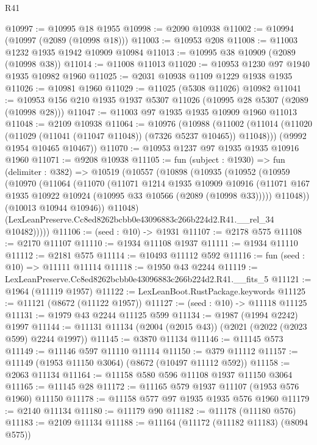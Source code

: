 \begin{lexlean}{R41}
\begin{coremodule}
@10997 := @10995 @18 @1955
@10998 := @2090 @10938
@11002 := @10994 (@10997 (@2089 (@10998 @18)))
@11003 := @10953 @208
@11008 := @11003 @1232 @1935 @1942 @10909 @10984
@11013 := @10995 @38 @10909 (@2089 (@10998 @38))
@11014 := @11008 @11013
@11020 := @10953 @1230 @97 @1940 @1935 @10982 @1960
@11025 := @2031 @10938 @1109 @1229 @1938 @1935
@11026 := @10981 @1960
@11029 := @11025 (@5308 @11026) @10982
@11041 := @10953 @156 @210 @1935 @1937 @5307 @11026 (@10995 @28 @5307 (@2089 (@10998 @28)))
@11047 := @11003 @97 @1935 @1935 @10909 @1960 @11013
@11048 := @2109 @10938
@11064 := @10976
    (@10988
      (@11002 (@11014 (@11020 (@11029 (@11041 (@11047 @11048)) (@7326 @5237 @10465)) @11048)))
      (@9992 @1954 @10465 @10467))
@11070 := @10953 @1237 @97 @1935 @1935 @10916 @1960
@11071 := @9208 @10938
@11105 := fun (subject : @1930) =>
  fun (delimiter : @382) =>
  @10519
    (@10557
      (@10898
        (@10935
          (@10952
            (@10959
              (@10970
                (@11064
                  (@11070
                    (@11071
                      @1214
                      @1935
                      @10909
                      @10916
                      (@11071 @167 @1935 @10922 @10924 (@10995 @33 @10566 (@2089 (@10998 @33)))))
                    @11048))
                (@10013 @10944 @10946))
              @11048)
            (LexLeanPreserve.Cc8ed8262bcbb0e43096883c266b224d2.R41.__rel_34 @10482)))))
@11106 := (seed : @10) -> @1931
@11107 := @2178 @575
@11108 := @2170 @11107
@11110 := @1934 @11108 @1937
@11111 := @1934 @11110
@11112 := @2181 @575
@11114 := @10493 @11112 @592
@11116 := fun (seed : @10) => @11111 @11114
@11118 := @1950 @43 @2244
@11119 := LexLeanPreserve.Cc8ed8262bcbb0e43096883c266b224d2.R41.__fits_5
@11121 := @1964 (@11119 @1957)
@11122 := LexLeanBoot.RustPackage.keywords
@11125 := @11121 (@8672 (@11122 @1957))
@11127 := (seed : @10) -> @11118 @11125
@11131 := @1979 @43 @2244 @11125 @599
@11134 := @1987 (@1994 @2242) @1997
@11144 := @11131 @11134 (@2004 (@2015 @43)) (@2021 (@2022 (@2023 @599) @2244 @1997))
@11145 := @3870 @11134
@11146 := @11145 @573
@11149 := @11146 @597 @11110 @11114
@11150 := @379 @11112
@11157 := @11149 (@1953 @11150 @3064) (@8672 (@10497 @11112 @592))
@11158 := @2063 @11134
@11164 := @11158 @580 @596 @11108 @1937 @11150 @3064
@11165 := @11145 @28
@11172 := @11165 @579 @1937 @11107 (@1953 @576 @1960) @11150
@11178 := @11158 @577 @97 @1935 @1935 @576 @1960
@11179 := @2140 @11134
@11180 := @11179 @90
@11182 := @11178 (@11180 @576)
@11183 := @2109 @11134
@11188 := @11164 (@11172 (@11182 @11183) (@8094 @575))

\end{coremodule}
\end{lexlean}
